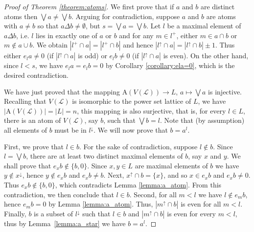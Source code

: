\documentclass[a4paper, 11pt]{article}
\theoremstyle{plain}
\theoremstyle{definition}
\newcommand{\bigjoin}   {\bigvee}
\newcommand{\Atoms}     {\mathrm{A}}
\begin{document}
\begin{proof}[Proof of Theorem \ref{theorem:atoms}]
    We first prove that if $a$ and $b$ are distinct atoms then $\bigjoin a \ne \bigjoin b$. Arguing for contradiction, suppose $a$ and $b$ are atoms with $a \ne b$ so that $a \Delta b \ne \emptyset$, but $s = \bigjoin a = \bigjoin b$. Let $l$ be a maximal element of $a \Delta b$, i.e. $l$ lies in exactly one of $a$ or $b$ and for any $m \in l^+$, either $m \in a \cap b$ or $m \notin a \cup b$. We obtain $|l^+ \cap a| = |l^+ \cap b|$ and hence $|l^\uparrow \cap a| = |l^\uparrow \cap b| \pm 1$. Thus either $e_l a \ne 0$ (if $|l^\uparrow \cap a|$ is odd) or $e_l b \ne 0$ (if $|l^\uparrow \cap a|$ is even). On the other hand, since $l < s$, we have $e_l a = e_l b = 0$ by Corollary \ref{corollary:ela=0}, which is the desired contradiction.

    We have just proved that the mapping $\Atoms( V( \mathcal{L} ) ) \to L$, $a \mapsto \bigjoin a$ is injective. Recalling that $V(\mathcal{L})$ is isomorphic to the power set lattice of $L$, we have $| \Atoms( V( \mathcal{L} ) ) | = | L | = n$, this mapping is also surjective, that is, for every $l \in L$, there is an atom of $V( \mathcal{L} )$, say $b$, such that $\bigjoin b = l$. Note that (by assumption) all elements of $b$ must be in $l^\downarrow$. We will now prove that $b = a^l$.

    First, we prove that $l \in b$. For the sake of contradiction, suppose $l \notin b$. Since $l = \bigjoin b$, there are at least two distinct maximal elements of $b$, say $x$ and $y$. We shall prove that $e_x b \notin \{ b, 0 \}$. Since $x, y \in L$ are maximal elements of $b$ we have $y \not \in x^{\downarrow}$, hence $y \notin e_x b$ and $e_x b \ne b$. Next,  $x^\uparrow \cap b = \{ x \}$, and so $x \in e_x b$ and $e_x b \ne 0$. Thus $e_x b \notin \{ b, 0 \}$, which contradicts Lemma \ref{lemma:a_atom}. From this contradiction, we then conclude that $l \in b$. Second, for all $m < l$ we have $l \notin e_m b$, hence $e_m b = 0$ by Lemma \ref{lemma:a_atom}. Thus, $|m^\uparrow \cap b|$ is even for all $m < l$. Finally, $b$ is a subset of $l^\downarrow$ such that $l \in b$ and $| m^\uparrow \cap b |$ is even for every $m < l$, thus by Lemma~\ref{lemma:a_star} we have $b = a^l$.  
\end{proof}
\end{document}
